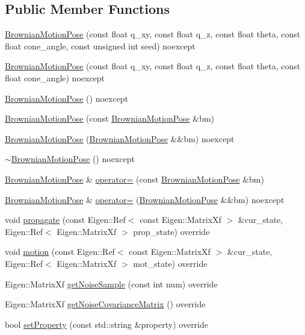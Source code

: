\subsection*{Public Member Functions}
\begin{DoxyCompactItemize}
\item 
\hyperlink{classBrownianMotionPose_afb57354af3029be488d8416733fbc876}{Brownian\+Motion\+Pose} (const float q\+\_\+xy, const float q\+\_\+z, const float theta, const float cone\+\_\+angle, const unsigned int seed) noexcept
\item 
\hyperlink{classBrownianMotionPose_a033bba640c6452cf0c092abdfa255476}{Brownian\+Motion\+Pose} (const float q\+\_\+xy, const float q\+\_\+z, const float theta, const float cone\+\_\+angle) noexcept
\item 
\hyperlink{classBrownianMotionPose_a042a889f5458b823f067ec600c0ef7b1}{Brownian\+Motion\+Pose} () noexcept
\item 
\hyperlink{classBrownianMotionPose_a0230a822152e6c3f4bc500f86d226b67}{Brownian\+Motion\+Pose} (const \hyperlink{classBrownianMotionPose}{Brownian\+Motion\+Pose} \&bm)
\item 
\hyperlink{classBrownianMotionPose_a5a434f3a0793dd49ea9c4337263636cc}{Brownian\+Motion\+Pose} (\hyperlink{classBrownianMotionPose}{Brownian\+Motion\+Pose} \&\&bm) noexcept
\item 
\hyperlink{classBrownianMotionPose_a12688413184c0b6d757061113a3270db}{$\sim$\+Brownian\+Motion\+Pose} () noexcept
\item 
\hyperlink{classBrownianMotionPose}{Brownian\+Motion\+Pose} \& \hyperlink{classBrownianMotionPose_af57c473922affe4baee38cffe47980d4}{operator=} (const \hyperlink{classBrownianMotionPose}{Brownian\+Motion\+Pose} \&bm)
\item 
\hyperlink{classBrownianMotionPose}{Brownian\+Motion\+Pose} \& \hyperlink{classBrownianMotionPose_a7777bea70e539e180c4748e1e0d50f6e}{operator=} (\hyperlink{classBrownianMotionPose}{Brownian\+Motion\+Pose} \&\&bm) noexcept
\item 
void \hyperlink{classBrownianMotionPose_ac598d506c496740d111ff9ceb4a97459}{propagate} (const Eigen\+::\+Ref$<$ const Eigen\+::\+Matrix\+Xf $>$ \&cur\+\_\+state, Eigen\+::\+Ref$<$ Eigen\+::\+Matrix\+Xf $>$ prop\+\_\+state) override
\item 
void \hyperlink{classBrownianMotionPose_ab1587dfdc83f92d0def84de227d90ddb}{motion} (const Eigen\+::\+Ref$<$ const Eigen\+::\+Matrix\+Xf $>$ \&cur\+\_\+state, Eigen\+::\+Ref$<$ Eigen\+::\+Matrix\+Xf $>$ mot\+\_\+state) override
\item 
Eigen\+::\+Matrix\+Xf \hyperlink{classBrownianMotionPose_a51407ee62d9e384af89c88c5b21c82df}{get\+Noise\+Sample} (const int num) override
\item 
Eigen\+::\+Matrix\+Xf \hyperlink{classBrownianMotionPose_a9b008d4c1b94154a9997454d74eaef88}{get\+Noise\+Covariance\+Matrix} () override
\item 
bool \hyperlink{classBrownianMotionPose_a22ec27f2c6b1c7899a331bbb9390c468}{set\+Property} (const std\+::string \&property) override
\end{DoxyCompactItemize}
